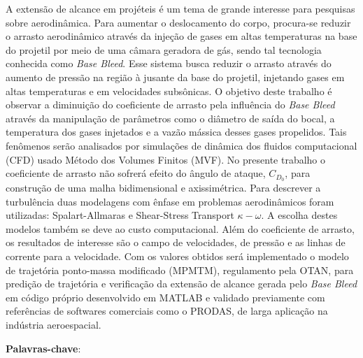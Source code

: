 \setlength{\absparsep}{18pt} %
\begin{resumo}
\SingleSpacing

A extensão de alcance em projéteis é um tema de grande interesse para pesquisas sobre aerodinâmica. Para aumentar o deslocamento do corpo, procura-se reduzir o arrasto aerodinâmico através da injeção de gases em altas temperaturas na base do projetil por meio de uma câmara geradora de gás, sendo tal tecnologia conhecida como \textit{Base Bleed}. Esse sistema busca reduzir o arrasto através do aumento de pressão na região à jusante da base do projetil, injetando gases em altas temperaturas e em velocidades subsônicas. O objetivo deste trabalho é observar a diminuição do coeficiente de arrasto pela influência do \textit{Base Bleed} através da manipulação de parâmetros como o diâmetro de saída do bocal, a temperatura dos gases injetados e a vazão mássica desses gases propelidos. Tais fenômenos serão analisados por simulações de dinâmica dos fluidos computacional (CFD) usado Método dos Volumes Finitos (MVF). No presente trabalho o coeficiente de arrasto não sofrerá efeito do ângulo de ataque, $C_{D_{0}}$, para construção de uma malha bidimensional e axissimétrica.
Para descrever a turbulência duas modelagens com ênfase em problemas aerodinâmicos foram utilizadas: Spalart-Allmaras e Shear-Stress Transport $\kappa-\omega$. A escolha destes modelos também se deve ao custo computacional. Além do coeficiente de arrasto, os resultados de interesse são o campo de velocidades, de pressão e as linhas de corrente para a velocidade. Com os valores obtidos será implementado o modelo de trajetória ponto-massa modificado (MPMTM), regulamento pela OTAN, para predição de trajetória e verificação da extensão de alcance gerada pelo \textit{Base Bleed} em código próprio desenvolvido em MATLAB e validado previamente com referências de softwares comerciais como o PRODAS, de larga aplicação na indústria aeroespacial.

\textbf{Palavras-chave}: \imprimirpalavraschave
\end{resumo}

